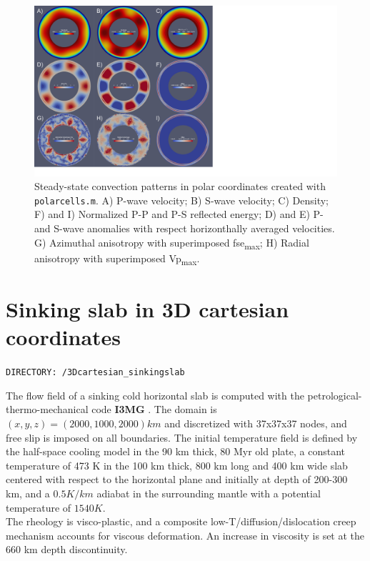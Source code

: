 \begin{figure}
    \centering
    \includegraphics[width=1.0\textwidth]{cookbooks/polarcells.pdf}
    \caption{Steady-state convection patterns in polar coordinates created with \texttt{polarcells.m}. A) P-wave velocity; B) S-wave velocity; C) Density; F) and I) Normalized P-P and P-S reflected energy; D) and E) P- and S-wave anomalies with respect horizonthally averaged velocities. G) Azimuthal anisotropy with superimposed fse\textsubscript{max}; H) Radial anisotropy with superimposed Vp\textsubscript{max}.\\
    }
    \label{fig:polarcells}
\end{figure}

\vfill %

\section{Sinking slab in 3D cartesian coordinates}
\label{section:cookbook_3Dcartesian_sinking}

\texttt{DIRECTORY: /3Dcartesian\_sinkingslab}

The flow field of a sinking cold horizontal slab is computed with the petrological-thermo-mechanical code \textbf{I3MG} \citep{gerya2003pepi}.
The domain is $(x,y,z)=(2000,1000,2000) km$ and discretized with 37x37x37 nodes, and free slip is imposed on all boundaries. The initial temperature field is defined by the half-space cooling model in the 90 km thick, 80 Myr old plate, a constant temperature of 473 K in the 100 km thick, 800 km long and 400 km wide slab centered with respect to the horizontal plane and initially at depth of 200-300 km, and a $0.5 K/km$ adiabat in the surrounding mantle with a potential temperature of $1540 K$. \\
The rheology is visco-plastic, and a composite low-T/diffusion/dislocation creep mechanism accounts for viscous deformation. An increase in viscosity is set at the 660 km depth discontinuity. \\

